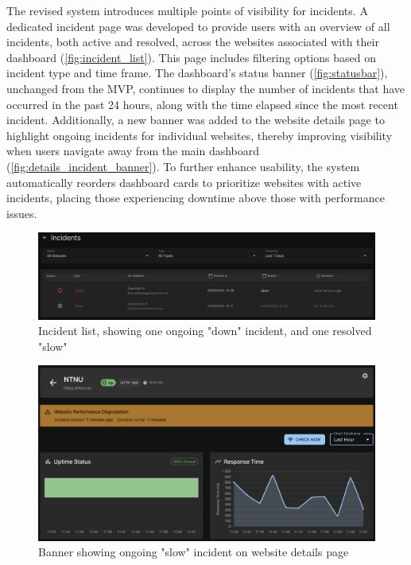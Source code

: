 The revised system introduces multiple points of visibility for incidents. A dedicated incident page was developed to provide users with an overview of all incidents, both active and resolved, across the websites associated with their dashboard (\autoref{fig:incident_list}). This page includes filtering options based on incident type and time frame. The dashboard’s status banner (\autoref{fig:statusbar}), unchanged from the MVP, continues to display the number of incidents that have occurred in the past 24 hours, along with the time elapsed since the most recent incident. Additionally, a new banner was added to the website details page to highlight ongoing incidents for individual websites, thereby improving visibility when users navigate away from the main dashboard (\autoref{fig:details_incident_banner}). To further enhance usability, the system automatically reorders dashboard cards to prioritize websites with active incidents, placing those experiencing downtime above those with performance issues.



\begin{figure}[H]
\centering
\includegraphics[width=1\textwidth]{figures/IncidentList.png}
\caption{Incident list, showing one ongoing "down" incident, and one resolved "slow"}
\label{fig:incident_list}
\end{figure}

\begin{figure}[H]
\centering
\includegraphics[width=1\textwidth]{figures/websiteDetails.png}
\caption{Banner showing ongoing "slow" incident on website details page}
\label{fig:details_incident_banner}
\end{figure}



